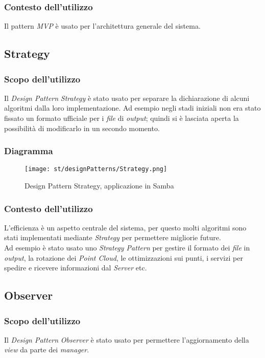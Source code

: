\subsubsection{Contesto dell'utilizzo}
Il pattern \emph{MVP} è usato per l'architettura generale del sistema. 

\subsection{Strategy}
\subsubsection{Scopo dell'utilizzo}
Il \emph{Design Pattern} \emph{Strategy} è stato usato per separare la dichiarazione di alcuni algoritmi dalla loro implementazione. Ad esempio negli stadi iniziali non era stato fissato un formato ufficiale per i \emph{file} di \emph{output}; quindi si è lasciata aperta la possibilità di modificarlo in un secondo momento.
\subsubsection{Diagramma}
\begin{figure}[H] 
    \centering 
    \texttt{[image: st/designPatterns/Strategy.png]} 
    \caption{Design Pattern Strategy, applicazione in Samba}
\end{figure}
\subsubsection{Contesto dell'utilizzo}
L'efficienza è un aspetto centrale del sistema, per questo molti algoritmi sono stati implementati mediante \emph{Strategy} per permettere migliorie future.\\
Ad esempio è stato usato uno \emph{Strategy Pattern} per gestire il formato dei \emph{file} in \emph{output}, la rotazione dei \emph{Point Cloud}, le ottimizzazioni sui punti, i servizi per spedire e ricevere informazioni dal \emph{Server} etc.

\subsection{Observer}
\subsubsection{Scopo dell'utilizzo}
Il \emph{Design Pattern} \emph{Observer} è stato usato per permettere l'aggiornamento della \emph{view} da parte dei \emph{manager}.

